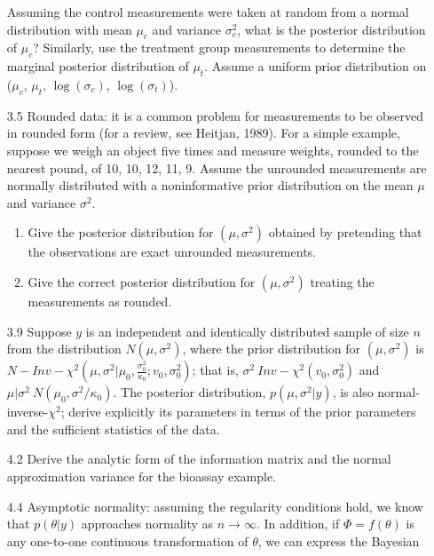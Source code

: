 \documentclass[12pt,a4paper,twoside]{article}
\begin{document}
\begin{enumerate}
    Assuming the control measurements were taken at random from a normal distribution with mean $\mu_c$ and variance $\sigma^{2}_{c}$,
    what is the posterior distribution of $\mu_c$? Similarly, use the treatment group measurements to determine the marginal posterior
    distribution of $\mu_t$. Assume a uniform prior distribution on ($\mu_c$, $\mu_t$, $\log(\sigma_c)$, $\log(\sigma_t)$).
    \item[3.5]\cite{Chapter3Exercises} Rounded data: it is a common problem for measurements to be observed in rounded form (for a review, see
    Heitjan, 1989). For a simple example, suppose we weigh an object five times and measure weights, rounded to the nearest pound, of 10, 10,
    12, 11, 9. Assume the unrounded measurements are normally distributed with a noninformative prior distribution on the mean $\mu$ and
    variance $\sigma^2$.
    \begin{enumerate}[label=$\alph*)$]
        \item Give the posterior distribution for $(\mu, \sigma^2)$ obtained by pretending that the observations are exact unrounded
        measurements.
        \item Give the correct posterior distribution for $(\mu, \sigma^2)$ treating the measurements as rounded.
    \end{enumerate}
    \item[3.9]\cite{Chapter3Exercises} Suppose $y$ is an independent and identically distributed sample of size $n$ from the distribution
    $N(\mu, \sigma^2)$, where the prior distribution for $(\mu, \sigma^2)$ is\\$N-Inv-\chi^2(\mu, \sigma^2|\mu_0, \frac{\sigma^2_0}{\kappa_0}; v_0,
    \sigma^{2}_{0})$; that is, $\sigma^2 ~ Inv-\chi^2(v_0, \sigma^2_0)$ and $\mu|\sigma^2 ~ N(\mu_0, \sigma^2/\kappa_ 0)$. The posterior distribution,
    $p(\mu, \sigma^2|y)$, is also normal-inverse-$\chi^2$; derive explicitly its parameters in terms of the prior parameters and the sufficient
    statistics of the data.
    \item[4.2]\cite{Chapter4Exercises} Derive the analytic form of the information matrix and the normal approximation variance for the bioassay
    example\cite{BioassayExample}.
    \item[4.4]\cite{Chapter4Exercises} Asymptotic normality: assuming the regularity conditions hold, we know that $p(\theta|y)$ approaches normality
    as $n \rightarrow \infty$. In addition, if $\Phi = f(\theta)$ is any one-to-one continuous transformation of $\theta$, we can express the Bayesian

\end{enumerate}
\end{document}
